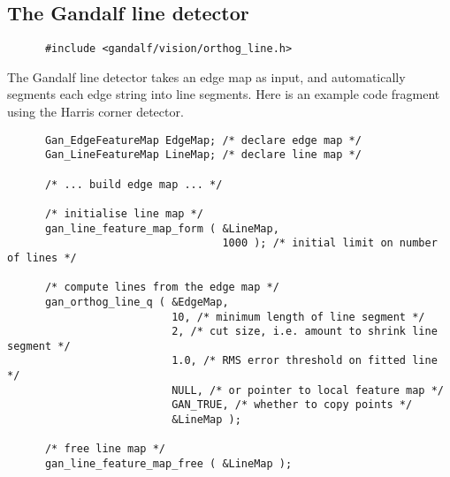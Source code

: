 \subsection{The Gandalf line detector}
\begin{verbatim}
      #include <gandalf/vision/orthog_line.h>
\end{verbatim}
The Gandalf line detector takes an edge map as input, and automatically
segments each edge string into line segments.
Here is an example code fragment using the Harris corner detector.
\begin{verbatim}
      Gan_EdgeFeatureMap EdgeMap; /* declare edge map */
      Gan_LineFeatureMap LineMap; /* declare line map */

      /* ... build edge map ... */

      /* initialise line map */
      gan_line_feature_map_form ( &LineMap,
                                  1000 ); /* initial limit on number of lines */

      /* compute lines from the edge map */
      gan_orthog_line_q ( &EdgeMap,
                          10, /* minimum length of line segment */
                          2, /* cut size, i.e. amount to shrink line segment */
                          1.0, /* RMS error threshold on fitted line */
                          NULL, /* or pointer to local feature map */
                          GAN_TRUE, /* whether to copy points */
                          &LineMap );

      /* free line map */
      gan_line_feature_map_free ( &LineMap );
\end{verbatim}

